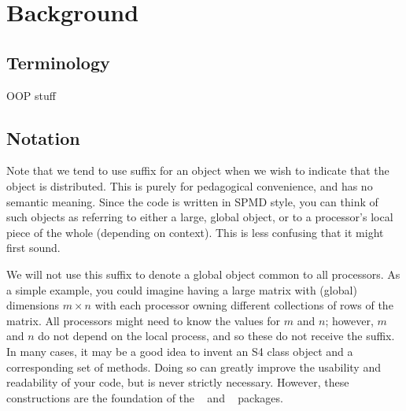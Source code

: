 \section{Background}
\label{sec:bg}



\subsection{Terminology}

OOP stuff

\subsection[Notation]{Notation}
\label{sec:notation}

Note that we tend to use suffix  for an object when we wish to indicate that the object is distributed.  This is purely for pedagogical convenience, and has no semantic meaning.  Since the code is written in SPMD style, you can think of such objects as referring to either a large, global object, or to a processor's local piece of the whole (depending on context).  This is less confusing that it might first sound.


We will not use this suffix to denote a global object common to all processors.  As a simple example, you could imagine having a large matrix with (global) dimensions $m\times n$ with each processor owning different collections of rows of the matrix.  All processors might need to know the values for $m$ and $n$; however, $m$ and $n$ do not depend on the local process, and so these do not receive the  suffix.  In many cases, it may be a good idea to invent an S4 class object and a corresponding set of methods.  Doing so can greatly improve the usability and readability of your code, but is never strictly necessary.  However, these constructions are the foundation of the ~\citep{Schmidt2012pbdBASEpackage} and
~\citep{Schmidt2012pbdDMATpackage} packages.

